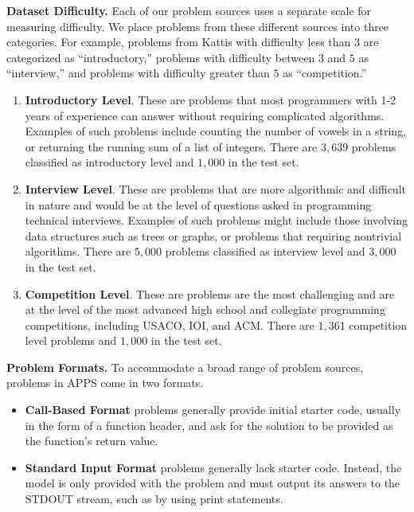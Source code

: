 \documentclass{article}
\begin{document}
\noindent\textbf{Dataset Difficulty.}\quad
Each of our problem sources uses a separate scale for measuring difficulty. We place problems from these different sources into three categories. For example, problems from Kattis with difficulty less than $3$ are categorized as ``introductory,'' problems with difficulty between $3$ and $5$ as ``interview,'' and problems with difficulty greater than $5$ as ``competition.''

\begin{enumerate}
    \item \textbf{Introductory Level}. These are problems that most programmers with 1-2 years of experience can answer without requiring complicated algorithms. Examples of such problems include counting the number of vowels in a string, or returning the running sum of a list of integers. There are $3,\!639$ problems classified as introductory level and $1,\!000$ in the test set.
    \item \textbf{Interview Level}. These are problems that are more algorithmic and difficult in nature and would be at the level of questions asked in programming technical interviews. Examples of such problems might include those involving data structures such as trees or graphs, or problems that requiring nontrivial algorithms. There are $5,\!000$ problems classified as interview level and $3,\!000$ in the test set.
    \item \textbf{Competition Level}. These are problems are the most challenging and are at the level of the most advanced high school and collegiate programming competitions, including USACO, IOI, and ACM. There are $1,\!361$ competition level problems and $1,\!000$ in the test set.
\end{enumerate}








\noindent\textbf{Problem Formats.}\quad 
To accommodate a broad range of problem sources, problems in APPS come in two formats.
\begin{itemize}
    \item \textbf{Call-Based Format} problems generally provide initial starter code, usually in the form of a function header, and ask for the solution to be provided as the function's return value.
    \item \textbf{Standard Input Format} problems generally lack starter code. Instead, the model is only provided with the problem and must output its answers to the STDOUT stream, such as by using print statements.
\end{itemize}
\end{document}
